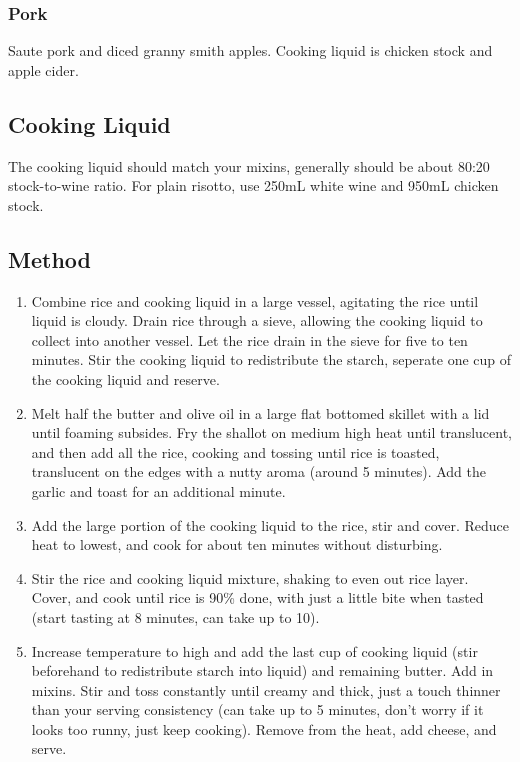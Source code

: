 \begin{multicols}{2}
    \subsubsection{Pork}
      Saute pork and diced granny smith apples. Cooking liquid is chicken stock and apple cider.
  \vfill\null
  \columnbreak
  \subsection{Cooking Liquid}
  The cooking liquid should match your mixins, generally should be about 80:20 stock-to-wine ratio. For plain risotto, use 250mL white wine and 950mL chicken stock.

  \subsection{Method}
    \begin{enumerate}
      \item Combine rice and cooking liquid in a large vessel, agitating the rice until liquid is cloudy. Drain rice through a sieve, allowing the cooking liquid to collect into another vessel. Let the rice drain in the sieve for five to ten minutes. Stir the cooking liquid to redistribute the starch, seperate one cup of the cooking liquid and reserve.
      \item Melt half the butter and olive oil in a large flat bottomed skillet with a lid until foaming subsides. Fry the shallot on medium high heat until translucent, and then add all the rice, cooking and tossing until rice is toasted, translucent on the edges with a nutty aroma (around 5 minutes). Add the garlic and toast for an additional minute.
      \item Add the large portion of the cooking liquid to the rice, stir and cover. Reduce heat to lowest, and cook for about ten minutes without disturbing.
      \item Stir the rice and cooking liquid mixture, shaking to even out rice layer. Cover, and cook until rice is 90\% done, with just a little bite when tasted (start tasting at 8 minutes, can take up to 10).
      \item Increase temperature to high and add the last cup of cooking liquid (stir beforehand to redistribute starch into liquid) and remaining butter. Add in mixins. Stir and toss constantly until creamy and thick, just a touch thinner than your serving consistency (can take up to 5 minutes, don’t worry if it looks too runny, just keep cooking). Remove from the heat, add cheese, and serve.
    \end{enumerate}
  \end{multicols}
